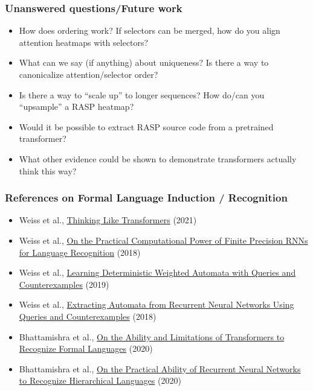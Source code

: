 \documentclass[mathserif,notheorems]{beamer}
\theoremstyle{plain} %
\theoremstyle{definition} %
\begin{document}
  \begin{frame}
    \frametitle{Unanswered questions/Future work}
    \begin{itemize}
      \item How does ordering work? If selectors can be merged, how do you align attention heatmaps with selectors?
      \item What can we say (if anything) about uniqueness? Is there a way to canonicalize attention/selector order?
      \item Is there a way to ``scale up'' to longer sequences? How do/can you ``upsample'' a RASP heatmap?
      \item Would it be possible to extract RASP source code from a pretrained transformer?
      \item What other evidence could be shown to demonstrate transformers actually think this way?
    \end{itemize}
  \end{frame}

  \begin{frame}
    \frametitle{References on Formal Language Induction / Recognition}
    \begin{itemize}
      \item Weiss et al., \href{https://arxiv.org/pdf/2009.11264v2.pdf}{Thinking Like Transformers} (2021)
      \item Weiss et al., \href{https://arxiv.org/pdf/1805.04908.pdf}{On the Practical Computational Power of Finite Precision RNNs for Language Recognition} (2018)
      \item Weiss et al., \href{https://arxiv.org/pdf/1910.13895.pdf}{Learning Deterministic Weighted Automata with Queries and Counterexamples} (2019)
      \item Weiss et al., \href{http://proceedings.mlr.press/v80/weiss18a/weiss18a.pdf}{Extracting Automata from Recurrent Neural Networks
      Using Queries and Counterexamples} (2018)
      \item Bhattamishra et al., \href{https://arxiv.org/pdf/2009.11264v2.pdf}{On the Ability and Limitations of Transformers to Recognize Formal Languages} (2020)
      \item Bhattamishra et al., \href{https://arxiv.org/pdf/2011.03965.pdf}{On the Practical Ability of Recurrent Neural Networks to Recognize Hierarchical Languages} (2020)
    \end{itemize}
  \end{frame}
\end{document}
